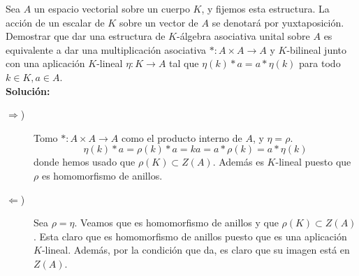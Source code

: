 \begin{ejercicio}
    Sea $A$ un espacio vectorial sobre un cuerpo $K$, y fijemos esta estructura. La acción de un escalar de $K$ sobre un vector de $A$ se denotará por yuxtaposición. Demostrar que dar una estructura de $K$-álgebra asociativa unital sobre $A$ es equivalente a dar una multiplicación asociativa $\ast:A\times A \to A$ y $K$-bilineal junto con una aplicación $K$-lineal $\eta:K \to A$ tal que $\eta(k)\ast a = a \ast \eta(k)$ para todo $k \in K, a \in A$. \\
    
    \noindent
    \textbf{Solución:}
    \begin{description}
        \item [$\Longrightarrow$)] Tomo $\ast:A\times A \to A$ como el producto interno de $A$, y $\eta = \rho$. 
            \begin{equation*}
                \eta(k)\ast a = \rho(k)\ast a = ka = a\ast \rho(k) = a \ast \eta(k)
            \end{equation*}
            donde hemos usado que $\rho(K) \subset Z(A)$. Además es $K$-lineal puesto que $\rho$ es homomorfismo de anillos.
        \item [$\Longleftarrow$)] Sea $\rho = \eta$. Veamos que es homomorfismo de anillos y que $\rho(K) \subset Z(A)$. Esta claro que es homomorfismo de anillos puesto que es una aplicación $K$-lineal. Además, por la condición que da, es claro que su imagen está en $Z(A)$. 
    \end{description}
    
\end{ejercicio}
